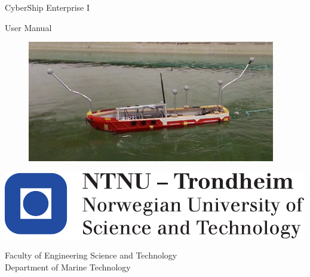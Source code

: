 \documentclass[12pt]{report}
\begin{document}
\thispagestyle{empty}

\vspace*{3cm}

\begin{center}
	{\LARGE{}CyberShip Enterprise I}
	\par\end{center}{\LARGE \par}

\begin{center}
	{\LARGE{}User Manual }
	\par\end{center}{\LARGE \par}

\begin{figure}[h!]
	\centering
	\includegraphics[width=0.5\linewidth]{fig/CSE1.png}
\end{figure}


\begin{flushleft}
	\vfill{}
	\par\end{flushleft}

\begin{flushleft}
	\includegraphics[scale=0.6]{fig/NTNU_logo.pdf}
	\par\end{flushleft}
Faculty of Engineering Science and Technology\\
Department of Marine Technology


\clearpage{}%

\setcounter{page}{0}

\tableofcontents
\setcounter{page}{0}



%

  
\end{document}
